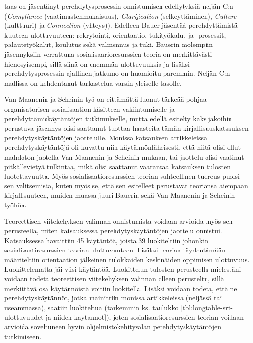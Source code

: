 \documentclass[utf8]{gradu3}
\begin{document}
\textcite{bauer-2010} taas on jäsentänyt perehdytysprosessin onnistumisen edellytyksiä neljän C:n (\textit{Compliance} (vaatimustenmukaisuus), \textit{Clarification} (selkeyttäminen), \textit{Culture} (kulttuuri) ja \textit{Connection} (yhteys)). Edelleen Bauer jäsentää perehdyttämistä kuuteen ulottuvuuteen: rekrytointi, orientaatio, tukityökalut ja -prosessit, palautetyökalut, koulutus sekä valmennus ja tuki. Bauerin molempiin jäsennyksiin verrattuna sosialisaarioresurssien teoria \parencite{saks-gruman-2012} on merkittävästi hienosyisempi, sillä siinä on enemmän ulottuvuuksia ja lisäksi perehdytysprosessin ajallinen jatkumo on huomioitu paremmin. Neljän C:n mallissa \textcite{bauer-2010} on kohdentanut tarkastelua varsin yleiselle tasolle. 

Van Maanenin ja Scheinin työ on eittämättä luonut tärkeää pohjaa organisatorisen sosialisaation käsitteen vakiintumiselle ja perehdyttämiskäytäntöjen tutkimukselle, mutta edellä esitelty kaksijakoihin perustuva jäsennys olisi saattanut tuottaa haasteita tämän kirjallisuuskatsauksen perehdytyskäytäntöjen jaottelulle. Monissa katsauksen artikkeleissa perehdytyskäytäntöjä oli kuvattu niin käytännönläheisesti, että niitä olisi ollut mahdoton jaotella Van Maanenin ja Scheinin mukaan, tai jaottelu olisi vaatinut pitkällevietyä tulkintaa, mikä olisi saattanut vaarantaa katsauksen tulosten luotettavuutta. Myös sosialisaatioresurssien teorian suhteellinen tuoreus puolsi sen valitsemista, kuten myös se, että sen esitelleet \textcite{saks-gruman-2012} perustavat teoriansa aiempaan kirjallisuuteen, muiden muassa juuri Bauerin sekä Van Maanenin ja Scheinin työhön.

Teoreettisen viitekehyksen valinnan onnistumista voidaan arvioida myös sen perusteella, miten katsauksessa perehdytyskäytäntöjen jaottelu onnistui. Katsauksessa havaittiin 45 käytäntöä, joista 39 luokiteltiin johonkin sosialisaatiresurssien teorian \parencite{saks-gruman-2012} ulottuvuuteen. Lisäksi teoriaa täydentämään määriteltiin orientaation jälkeinen tulokkaiden keskinäiden oppimisen ulottuvuus. Luokittelematta jäi viisi käytäntöä. Luokittelun tulosten perusteella mielestäni voidaan todeta teoreettisen viitekehyksen valinnan olleen perusteltu, sillä merkittävä osa käytännöistä voitiin luokitella. Lisäksi voidaan todeta, että ne perehdytyskäytännöt, jotka mainittiin monissa artikkeleissa (neljässä tai useammassa), saatiin luokiteltua (tarkemmin ks. taulukko \ref{tbl:longtable-srt-ulottuvuudet-ja-niiden-kaytannot}), joten sosialisaatioresurssien teorian voidaan arvioida soveltuneen hyvin ohjelmistokehitysalan perehdytyskäytäntöjen tutkimiseen.
\end{document}
